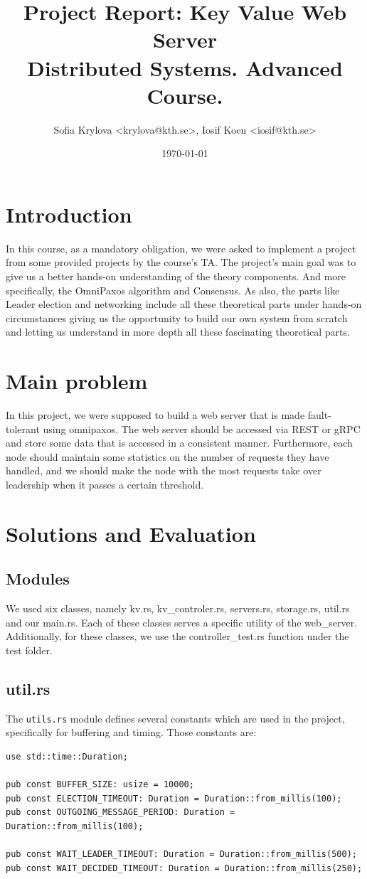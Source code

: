 \documentclass[a4paper, 11pt]{article}
\title{%
Project Report: Key Value Web Server \\
\large Distributed Systems. Advanced Course.}
\author{Sofia Krylova <krylova@kth.se>, Iosif Koen <iosif@kth.se>}
\date{\today{}}
\begin{document}
\maketitle

\section{Introduction}
In this course, as a mandatory obligation, we were asked to implement a project from some provided projects by the course's TA. The project's main goal was to give us a better hands-on understanding of the theory components. And more specifically, the OmniPaxos algorithm and Consensus. As also, the parts like Leader election and networking include all these theoretical parts under hands-on circumstances giving us the opportunity to build our own system from scratch and letting us understand in more depth all these fascinating theoretical parts.
\section{Main problem}

In this project, we were supposed to build a web server that is made fault-tolerant using omnipaxos.
The web server should be accessed via REST or gRPC and store some data that is
accessed in a consistent manner. Furthermore, each node should maintain some statistics on
the number of requests they have handled, and we should make the node with the most requests
take over leadership when it passes a certain threshold.

\section{Solutions and Evaluation}
\subsection{Modules}
We used six classes, namely kv.rs, kv\_controler.rs, servers.rs, storage.rs, util.rs and our main.rs.
Each of these classes serves a specific utility of the web\_server.
Additionally, for these classes, we use the controller\_test.rs function under the test folder.
\subsection{util.rs}
The \verb|utils.rs| module defines several constants which are used in the project, specifically for buffering and timing.
Those constants are:
\begin{verbatim}
use std::time::Duration;

pub const BUFFER_SIZE: usize = 10000;
pub const ELECTION_TIMEOUT: Duration = Duration::from_millis(100);
pub const OUTGOING_MESSAGE_PERIOD: Duration = Duration::from_millis(100);

pub const WAIT_LEADER_TIMEOUT: Duration = Duration::from_millis(500);
pub const WAIT_DECIDED_TIMEOUT: Duration = Duration::from_millis(250);
\end{verbatim}
\end{document}
